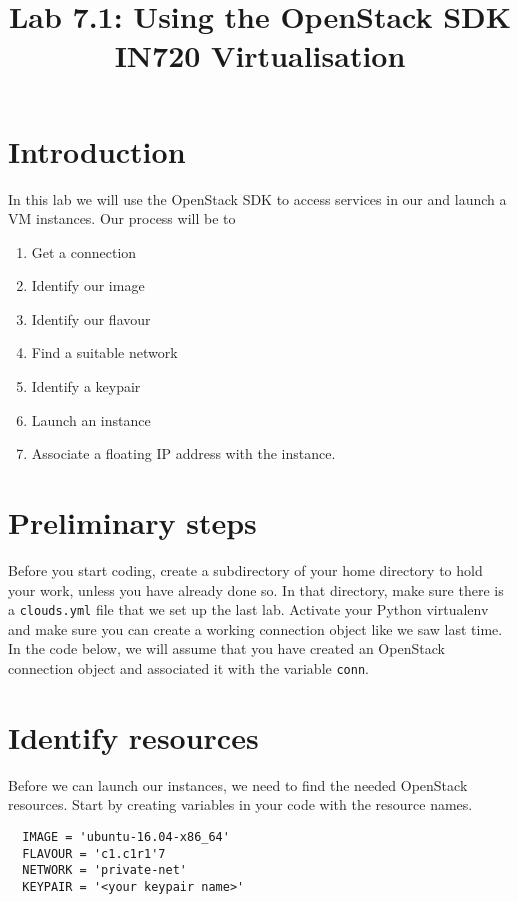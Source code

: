\documentclass{article}
\begin{document}
\title{Lab 7.1: Using the OpenStack SDK \\ IN720 Virtualisation}
\date{}
\maketitle

\section*{Introduction}
In this lab we will use the OpenStack SDK to access services in our and launch a VM instances. Our process will be to

\begin{enumerate}
  \item Get a connection 
  \item Identify our image
  \item Identify our flavour
  \item Find a suitable network
  \item Identify a keypair
  \item Launch an instance
  \item Associate a floating IP address with the instance.
\end{enumerate}

\section{Preliminary steps}
Before you start coding, create a subdirectory of your home directory to hold your work, unless you have already done so. In that directory, make sure there is a \texttt{clouds.yml} file that we set up the last lab. Activate your Python virtualenv and make sure you can create a working connection object like we saw last time. In the code below, we will assume that you have created an OpenStack connection object and associated it with the variable \texttt{conn}.

\section{Identify resources}
Before we can launch our instances, we need to find the needed OpenStack resources. Start by creating variables in your code with the resource names.

\begin{verbatim}
  IMAGE = 'ubuntu-16.04-x86_64'
  FLAVOUR = 'c1.c1r1'7
  NETWORK = 'private-net'
  KEYPAIR = '<your keypair name>'
\end{verbatim}
\end{document}
